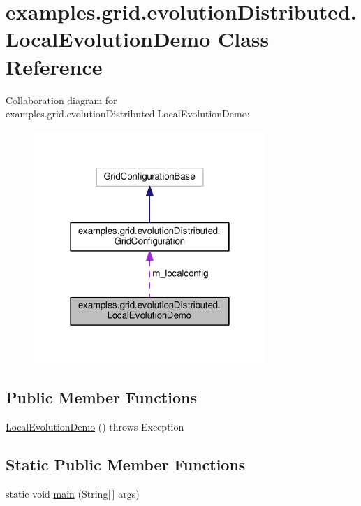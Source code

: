 \hypertarget{classexamples_1_1grid_1_1evolution_distributed_1_1_local_evolution_demo}{\section{examples.\-grid.\-evolution\-Distributed.\-Local\-Evolution\-Demo Class Reference}
\label{classexamples_1_1grid_1_1evolution_distributed_1_1_local_evolution_demo}
}


Collaboration diagram for examples.\-grid.\-evolution\-Distributed.\-Local\-Evolution\-Demo\-:
\nopagebreak
\begin{figure}[H]
\begin{center}
\leavevmode
\includegraphics[width=250pt]{classexamples_1_1grid_1_1evolution_distributed_1_1_local_evolution_demo__coll__graph}
\end{center}
\end{figure}
\subsection*{Public Member Functions}
\begin{DoxyCompactItemize}
\item 
\hyperlink{classexamples_1_1grid_1_1evolution_distributed_1_1_local_evolution_demo_abd68b267515c76b48a709b7546c6f1b6}{Local\-Evolution\-Demo} ()  throws Exception 
\end{DoxyCompactItemize}
\subsection*{Static Public Member Functions}
\begin{DoxyCompactItemize}
\item 
static void \hyperlink{classexamples_1_1grid_1_1evolution_distributed_1_1_local_evolution_demo_ada7df7586ef30ce81679a34799f8b217}{main} (String\mbox{[}$\,$\mbox{]} args)
\end{DoxyCompactItemize}
